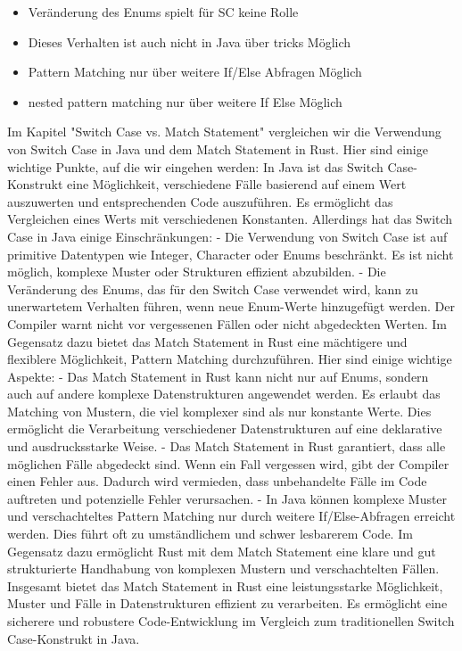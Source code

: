 \documentclass[a4paper, 1ppt]{article}
\begin{document}
\begin{itemize}
	\item Veränderung des Enums spielt für SC keine Rolle
\item Dieses Verhalten ist auch nicht in Java über tricks Möglich
\item Pattern Matching nur über weitere If/Else Abfragen Möglich
\item nested pattern matching nur über weitere If Else Möglich
\end{itemize}
Im Kapitel "Switch Case vs. Match Statement" vergleichen wir die Verwendung von Switch Case in Java und dem Match Statement in Rust. Hier sind einige wichtige Punkte, auf die wir eingehen werden:
In Java ist das Switch Case-Konstrukt eine Möglichkeit, verschiedene Fälle basierend auf einem Wert auszuwerten und entsprechenden Code auszuführen. Es ermöglicht das Vergleichen eines Werts mit verschiedenen Konstanten. Allerdings hat das Switch Case in Java einige Einschränkungen:
- Die Verwendung von Switch Case ist auf primitive Datentypen wie Integer, Character oder Enums beschränkt. Es ist nicht möglich, komplexe Muster oder Strukturen effizient abzubilden.
- Die Veränderung des Enums, das für den Switch Case verwendet wird, kann zu unerwartetem Verhalten führen, wenn neue Enum-Werte hinzugefügt werden. Der Compiler warnt nicht vor vergessenen Fällen oder nicht abgedeckten Werten.
Im Gegensatz dazu bietet das Match Statement in Rust eine mächtigere und flexiblere Möglichkeit, Pattern Matching durchzuführen. Hier sind einige wichtige Aspekte:
- Das Match Statement in Rust kann nicht nur auf Enums, sondern auch auf andere komplexe Datenstrukturen angewendet werden. Es erlaubt das Matching von Mustern, die viel komplexer sind als nur konstante Werte. Dies ermöglicht die Verarbeitung verschiedener Datenstrukturen auf eine deklarative und ausdrucksstarke Weise.
- Das Match Statement in Rust garantiert, dass alle möglichen Fälle abgedeckt sind. Wenn ein Fall vergessen wird, gibt der Compiler einen Fehler aus. Dadurch wird vermieden, dass unbehandelte Fälle im Code auftreten und potenzielle Fehler verursachen.
- In Java können komplexe Muster und verschachteltes Pattern Matching nur durch weitere If/Else-Abfragen erreicht werden. Dies führt oft zu umständlichem und schwer lesbarerem Code. Im Gegensatz dazu ermöglicht Rust mit dem Match Statement eine klare und gut strukturierte Handhabung von komplexen Mustern und verschachtelten Fällen.
Insgesamt bietet das Match Statement in Rust eine leistungsstarke Möglichkeit, Muster und Fälle in Datenstrukturen effizient zu verarbeiten. Es ermöglicht eine sicherere und robustere Code-Entwicklung im Vergleich zum traditionellen Switch Case-Konstrukt in Java.
\end{document}
